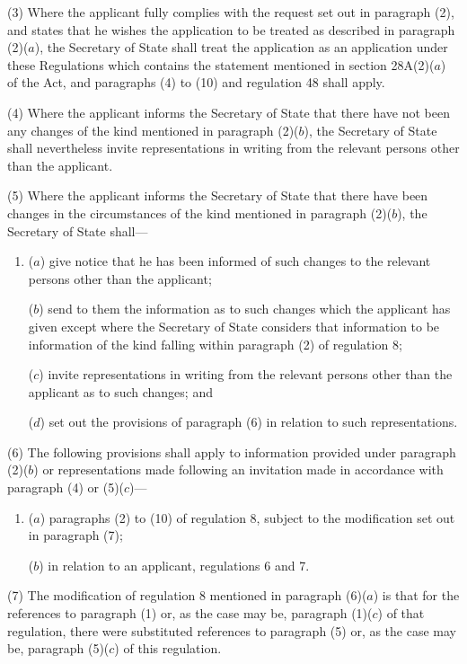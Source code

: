 \documentclass[12pt,a4paper]{article}
\begin{document}
(3) Where the applicant fully complies with the request set out in paragraph
(2), and states that he wishes the application to be treated as described in
paragraph (2)($a$), the Secretary of State shall treat the application as an
application under these Regulations which contains the statement mentioned in
section 28A(2)($a$) of the Act, and paragraphs (4) to (10) and regulation 48 shall
apply.

(4) Where the applicant informs the Secretary of State that there have not been
any changes of the kind mentioned in paragraph (2)($b$), the Secretary of State
shall nevertheless invite representations in writing from the relevant persons
other than the applicant.

(5) Where the applicant informs the Secretary of State that there have been
changes in the circumstances of the kind mentioned in paragraph (2)($b$), the
Secretary of State shall—
\begin{enumerate}\item[]
($a$) give notice that he has been informed of such changes to the relevant persons
other than the applicant;

($b$) send to them the information as to such changes which the applicant has given
except where the Secretary of State considers that information to be information
of the kind falling within paragraph (2) of regulation 8;

($c$) invite representations in writing from the relevant persons other than the
applicant as to such changes; and

($d$) set out the provisions of paragraph (6) in relation to such representations.
\end{enumerate}

(6) The following provisions shall apply to information provided under paragraph
(2)($b$) or representations made following an invitation made in accordance with
paragraph (4) or (5)($c$)—
\begin{enumerate}\item[]
($a$) paragraphs (2) 
to (10)  %
of regulation 8, subject to the modification set out in paragraph (7);

($b$) in relation to an applicant, regulations 6 and 7.
\end{enumerate}

(7) The modification of regulation 8 mentioned in paragraph (6)($a$) is that for
the references to paragraph (1) or, as the case may be, paragraph (1)($c$) of that
regulation, there were substituted references to paragraph (5) or, as the case
may be, paragraph (5)($c$) of this regulation.
\end{document}
